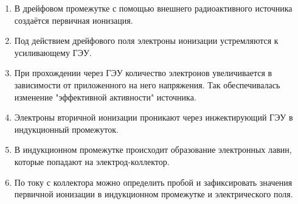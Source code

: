 \begin{enumerate}
	\item В дрейфовом промежутке с помощью внешнего радиоактивного источника создаётся первичная ионизация.
	\item Под действием дрейфового поля электроны ионизации устремляются к усиливающему ГЭУ.
	\item При прохождении через ГЭУ количество электронов увеличивается в зависимости от приложенного на него напряжения. Так обеспечивалась изменение "эффективной активности" источника.  
	\item Электроны вторичной ионизации проникают через инжектирующий ГЭУ в индукционный промежуток. 
	\item В индукционном промежутке происходит образование электронных лавин, которые попадают на электрод-коллектор. 
	\item По току с коллектора можно определить пробой и зафиксировать значения первичной ионизации в индукционном промежутке и электрического поля. 	
\end{enumerate}
